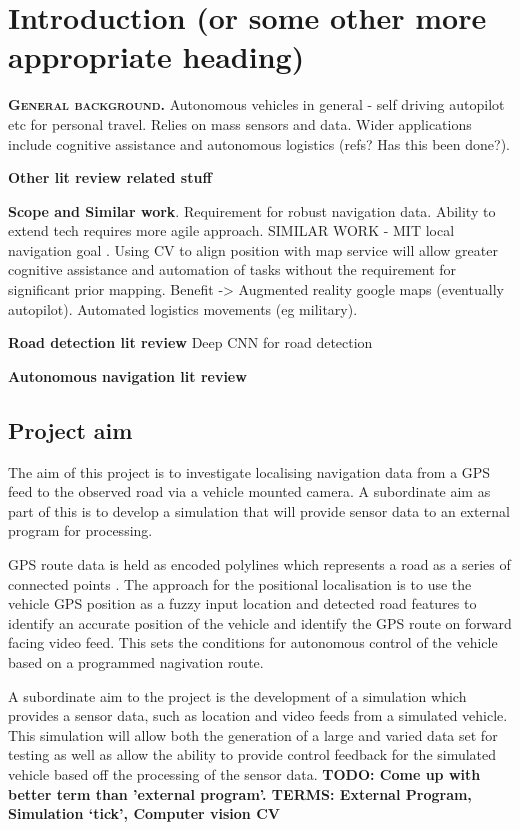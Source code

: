 \documentclass[]{aiaa-tc}%
\begin{document}
\newpage
\section{Introduction (or some other more appropriate heading)} \label{sect:intro}


\lettrine[nindent=0pt]{\textbf{G}}{\textbf{eneral background.}} Autonomous vehicles in general - self driving autopilot etc for personal travel. Relies on mass sensors and data. Wider applications include cognitive assistance and autonomous logistics (refs? Has this been done?). 

\textbf{Other lit review related stuff}

\textbf{Scope and Similar work}. Requirement for robust navigation data. Ability to extend tech requires more agile approach. SIMILAR WORK - MIT local navigation goal \cite{mitLocalNavDriving}. Using CV to align position with map service will allow greater cognitive assistance and automation of tasks without the requirement for significant prior mapping. Benefit -> Augmented reality google maps (eventually autopilot). Automated logistics movements (eg military).

\textbf{Road detection lit review} 
Deep CNN for road detection \cite{deepRoadSegmentation}

\textbf{Autonomous navigation lit review}

\subsection{Project aim}

The aim of this project is to investigate localising navigation data from a GPS feed to the observed road via a vehicle mounted camera. A subordinate aim as part of this is to develop a simulation that will provide sensor data to an external program for processing. 

GPS route data is held as encoded polylines which represents a road as a series of connected points \cite{googleMapPolyline}. The approach for the positional localisation is to use the vehicle GPS position as a fuzzy input location and detected road features to identify an accurate position of the vehicle and identify the GPS route on forward facing video feed. This sets the conditions for autonomous control of the vehicle based on a programmed nagivation route. 

A subordinate aim to the project is the development of a simulation which provides a sensor data, such as location and video feeds from a simulated vehicle. This simulation will allow both the generation of a large and varied data set for testing as well as allow the ability to provide control feedback for the simulated vehicle based off the processing of the sensor data.
\textbf{TODO: Come up with better term than 'external program'. TERMS: External Program, Simulation `tick', Computer vision CV}
\end{document}
